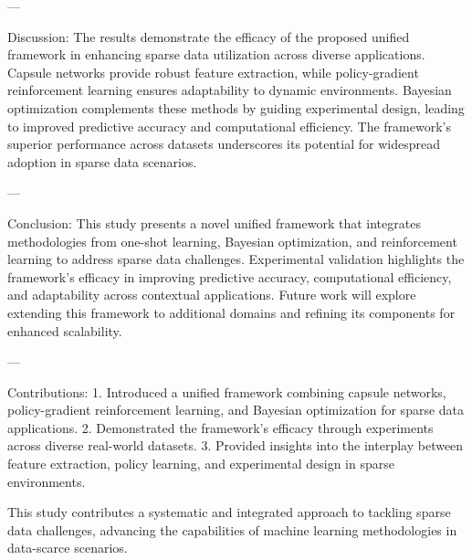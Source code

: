 ---

Discussion:  
The results demonstrate the efficacy of the proposed unified framework in enhancing sparse data utilization across diverse applications. Capsule networks provide robust feature extraction, while policy-gradient reinforcement learning ensures adaptability to dynamic environments. Bayesian optimization complements these methods by guiding experimental design, leading to improved predictive accuracy and computational efficiency. The framework's superior performance across datasets underscores its potential for widespread adoption in sparse data scenarios.

---

Conclusion:  
This study presents a novel unified framework that integrates methodologies from one-shot learning, Bayesian optimization, and reinforcement learning to address sparse data challenges. Experimental validation highlights the framework's efficacy in improving predictive accuracy, computational efficiency, and adaptability across contextual applications. Future work will explore extending this framework to additional domains and refining its components for enhanced scalability.

---

Contributions:  
1. Introduced a unified framework combining capsule networks, policy-gradient reinforcement learning, and Bayesian optimization for sparse data applications.  
2. Demonstrated the framework's efficacy through experiments across diverse real-world datasets.  
3. Provided insights into the interplay between feature extraction, policy learning, and experimental design in sparse environments.  

This study contributes a systematic and integrated approach to tackling sparse data challenges, advancing the capabilities of machine learning methodologies in data-scarce scenarios.